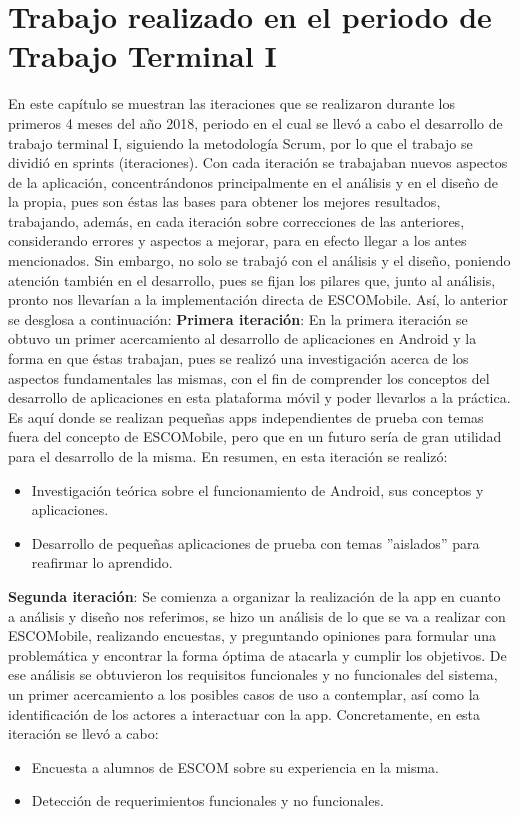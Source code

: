 \newline
\section{Trabajo realizado en el periodo de Trabajo Terminal I}

\noindent
En este capítulo se muestran las iteraciones que se realizaron durante los primeros 4 meses del año 2018, periodo en el cual se llevó a cabo el desarrollo de trabajo terminal I, siguiendo la metodología Scrum, por lo que el trabajo se dividió en sprints (iteraciones). Con cada iteración se trabajaban nuevos aspectos de la aplicación, concentrándonos principalmente en el análisis y en el diseño de la propia, pues son éstas las bases para obtener los mejores resultados, trabajando, además, en cada iteración sobre correcciones de las anteriores, considerando errores y aspectos a mejorar, para en efecto llegar a los antes mencionados. Sin embargo, no solo se trabajó con el análisis y el diseño, poniendo atención también en el desarrollo, pues se fijan los pilares que, junto al análisis, pronto nos llevarían a la implementación directa de ESCOMobile. Así, lo anterior se desglosa a continuación: 
\newline
\newline
\textbf{Primera iteración}: En la primera iteración se obtuvo un primer acercamiento al desarrollo de aplicaciones en Android y la forma en que éstas trabajan, pues se realizó una investigación acerca de los aspectos fundamentales las mismas, con el fin de comprender los conceptos del desarrollo de aplicaciones en esta plataforma móvil y poder llevarlos a la práctica. Es aquí donde se realizan pequeñas apps independientes de prueba con temas fuera del concepto de ESCOMobile, pero que en un futuro sería de gran utilidad para el desarrollo de la misma. En resumen, en esta iteración se realizó: 
\begin{itemize}
	\item Investigación teórica sobre el funcionamiento de Android, sus conceptos y aplicaciones.
	\item Desarrollo de pequeñas aplicaciones de prueba con temas ''aislados'' para reafirmar lo aprendido.
\end{itemize}

\noindent
\textbf{Segunda iteración}: Se comienza a organizar la realización de la app en cuanto a análisis y diseño nos referimos, se hizo un análisis de lo que se va a realizar con ESCOMobile, realizando encuestas, y preguntando opiniones para formular una problemática y encontrar la forma óptima de atacarla y cumplir los objetivos. De ese análisis se obtuvieron los requisitos funcionales y no funcionales del sistema, un primer acercamiento a los posibles casos de uso a contemplar, así como la identificación de los actores a interactuar con la app. Concretamente, en esta iteración se llevó a cabo: 
\begin{itemize}
	\item Encuesta a alumnos de ESCOM sobre su experiencia en la misma.
	\item Detección de requerimientos funcionales y no funcionales.
\end{itemize}

